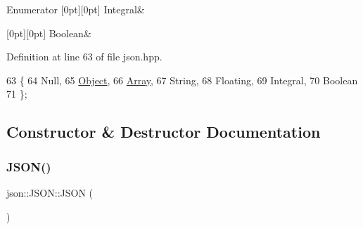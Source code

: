 \begin{DoxyEnumFields}{Enumerator}
[0pt][0pt]{}\mbox{\label{classjson_1_1_j_s_o_n_a762f55df6d407c1af61607ed516ffe07a4ea94552a2bec56a29592359a1b6069e}} 
Integral&\\
\hline

[0pt][0pt]{}\mbox{\label{classjson_1_1_j_s_o_n_a762f55df6d407c1af61607ed516ffe07a27226c864bac7454a8504f8edb15d95b}} 
Boolean&\\
\hline

\end{DoxyEnumFields}


Definition at line 63 of file json.\+hpp.


\begin{DoxyCode}
63                          \{
64             Null,
65             \mbox{\hyperlink{namespacejson_a7bc7d25f21c18a652a42db29cfdabd06}{Object}},
66             \mbox{\hyperlink{namespacejson_a805054691c80da00fd9129387f834c21}{Array}},
67             String,
68             Floating,
69             Integral,
70             Boolean
71         \};
\end{DoxyCode}


\subsection{Constructor \& Destructor Documentation}
\mbox{\label{classjson_1_1_j_s_o_n_a0334c8643ae2a6cd86020e02643bb20f}} 
\subsubsection{\texorpdfstring{J\+S\+O\+N()}{JSON()}\hspace{0.1cm}{\footnotesize\ttfamily [1/9]}}
{\footnotesize\ttfamily json\+::\+J\+S\+O\+N\+::\+J\+S\+ON (\begin{DoxyParamCaption}{ }\end{DoxyParamCaption})\hspace{0.3cm}{\ttfamily [inline]}}



